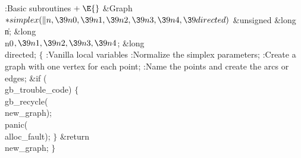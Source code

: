 \fi

\B{}:Basic subroutines\X${}\mathrel+\E{}$\6
\1\1\&{Graph} ${}{*}\\{simplex}(\|n,\39\\{n0},\39\\{n1},\39\\{n2},\39\\{n3},\39%
\\{n4},\39\\{directed}){}$\6
\&{unsigned} \&{long} \|n;\6
\&{long} \\{n0}${},\39\\{n1},\39\\{n2},\39\\{n3},\39\\{n4}{}$;\6
\&{long} \\{directed};\2\2\6
${}\{{}$\5
\1:Vanilla local variables\X\7
:Normalize the simplex parameters\X;\6
:Create a graph with one vertex for each point\X;\6
:Name the points and create the arcs or edges\X;\6
\&{if} (\\{gb\_trouble\_code})\5
${}\{{}$\1\6
\\{gb\_recycle}(\\{new\_graph});\6
\\{panic}(\\{alloc\_fault});\6
\4${}\}{}$\2\6
\&{return} \\{new\_graph};\6
\4${}\}{}$\2\par
\fi

